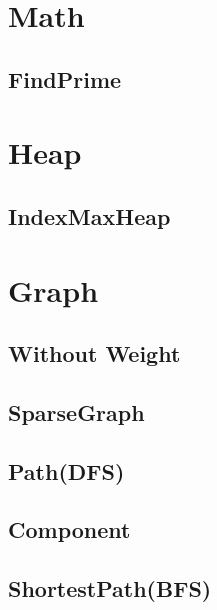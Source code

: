 \section{Math}
    \subsection{FindPrime}
        

\section{Heap}
    \subsection{IndexMaxHeap}
        

\section{Graph}
    \subsection{Without Weight}
        \subsection{SparseGraph}
            
        \subsection{Path(DFS)}
            
        \subsection{Component}
            
        \subsection{ShortestPath(BFS)}
            